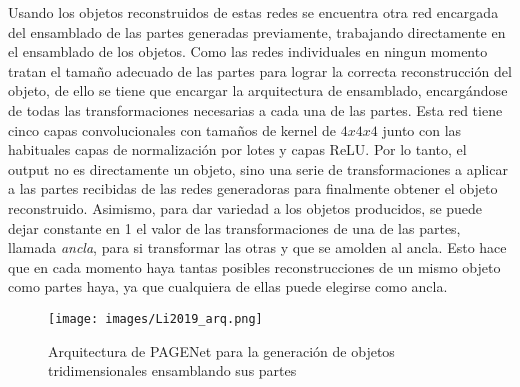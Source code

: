 \documentclass[12pt, spanish]{article}
\begin{document}
Usando los objetos reconstruidos de estas redes se encuentra otra red
encargada del ensamblado de las partes generadas previamente,
trabajando directamente en el ensamblado de los objetos.
Como las redes individuales en ningun momento tratan el tamaño
adecuado de las partes para lograr la correcta
reconstrucción del objeto, de ello se tiene que encargar la
arquitectura de ensamblado, encargándose de todas las
transformaciones necesarias a cada una de las partes. Esta
red tiene cinco capas convolucionales con tamaños de
kernel de \(4x4x4\) junto con las habituales capas de normalización
por lotes y capas ReLU. Por lo tanto, el output no es directamente
un objeto, sino una serie de transformaciones a aplicar a
las partes recibidas de las redes generadoras para finalmente obtener
el objeto reconstruido. Asimismo, para dar variedad a los objetos
producidos, se puede dejar constante en 1 el valor de las
transformaciones de una de las partes, llamada \textit{ancla}, para
si transformar las otras y que se amolden al ancla. Esto hace
que en cada momento haya tantas posibles reconstrucciones de un mismo
objeto como partes haya, ya que cualquiera de ellas puede elegirse
como ancla.


\begin{figure}[h]
\texttt{[image: images/Li2019\_arq.png]}
\centering
\caption{Arquitectura de PAGENet \cite{Li2019} para la generación de objetos tridimensionales ensamblando sus partes}
\label{PAGENet_arq}
\end{figure}
\end{document}
